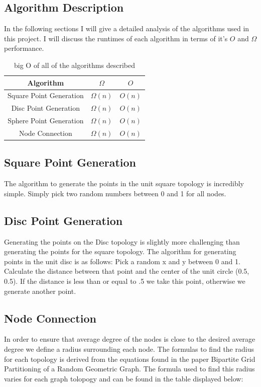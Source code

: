 \documentclass{article}
\begin{document}
	\subsection{Algorithm Description}
		In the following sections I will give a detailed analysis of the algorithms used in this project.
		I will discuss the runtimes of each algorithm in terms of it's $O$ and $\Omega$ performance.
    	\begin{center}
    		\begin{table}
    			\begin{tabular}{ |c|c|c| }
    				\hline
    				Algorithm & $\Omega$ & $O$ \\
    				\hline
    				Square Point Generation & $\Omega(n)$ & $O(n)$ \\
    				\hline
    				Disc Point Generation & $\Omega(n)$ & $O(n)$ \\
    				\hline
            Sphere Point Generation & $\Omega(n)$ & $O(n)$ \\
            \hline
    				Node Connection & $\Omega(n)$ & $O(n)$ \\
    				\hline
    			\end{tabular}
          \caption{big O of all of the algorithms described}
    		\end{table}
    	\end{center}

  \subsection{Square Point Generation}
		The algorithm to generate the points in the unit square topology is incredibly simple.
		Simply pick two random numbers between 0 and 1 for all nodes.

  \subsection{Disc Point Generation}
		Generating the points on the Disc topology is slightly more challenging than generating the points for the square topology.
    The algorithm for generating points in the unit disc is as follows:
    Pick a random x and y between 0 and 1.
    Calculate the distance between that point and the center of the unit circle (0.5, 0.5).
    If the distance is less than or equal to .5 we take this point, otherwise we generate another point.

	\subsection{Node Connection}
		In order to ensure that average degree of the nodes is close to the desired average degree we define a radius surrounding each node.
		The formulas to find the radius for each topology is derived from the equations found in the paper Bipartite Grid Partitioning of a Random Geometric Graph\cite{chen2017bipartite}.
		The formula used to find this radius varies for each graph tolopogy and can be found in the table displayed below:
\end{document}
